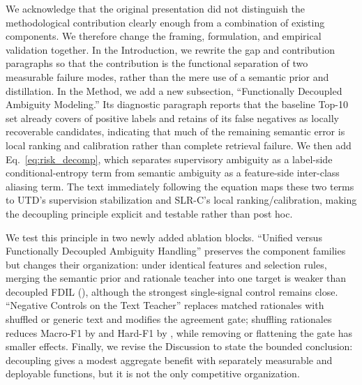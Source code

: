 {We acknowledge that the original presentation did not distinguish the methodological contribution clearly enough from a combination of existing components. We therefore change the framing, formulation, and empirical validation together. In the Introduction, we rewrite the gap and contribution paragraphs so that the contribution is the functional separation of two measurable failure modes, rather than the mere use of a semantic prior and distillation. In the Method, we add a new subsection, ``Functionally Decoupled Ambiguity Modeling.'' Its diagnostic paragraph reports that the baseline Top-10 set already covers  of positive labels and retains  of its false negatives as locally recoverable candidates, indicating that much of the remaining semantic error is local ranking and calibration rather than complete retrieval failure. We then add Eq.~\eqref{eq:risk_decomp}, which separates supervisory ambiguity as a label-side conditional-entropy term from semantic ambiguity as a feature-side inter-class aliasing term. The text immediately following the equation maps these two terms to UTD's supervision stabilization and SLR-C's local ranking/calibration, making the decoupling principle explicit and testable rather than post hoc.

We test this principle in two newly added ablation blocks. ``Unified versus Functionally Decoupled Ambiguity Handling'' preserves the component families but changes their organization: under identical features and selection rules, merging the semantic prior and rationale teacher into one target is weaker than decoupled FDIL (), although the strongest single-signal control remains close. ``Negative Controls on the Text Teacher'' replaces matched rationales with shuffled or generic text and modifies the agreement gate; shuffling rationales reduces Macro-F1 by  and Hard-F1 by , while removing or flattening the gate has smaller effects. Finally, we revise the Discussion to state the bounded conclusion: decoupling gives a modest aggregate benefit with separately measurable and deployable functions, but it is not the only competitive organization.
}
\showUnifiedDecoupled
\showNegativeControls
